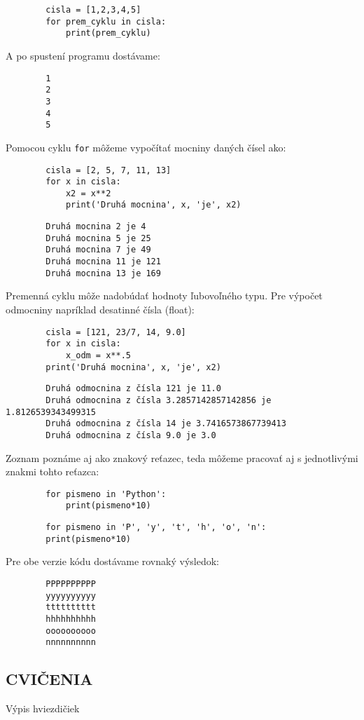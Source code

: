 \documentclass[a4paper,11pt]{report}
\begin{document}
	\begin{verbatim}
		cisla = [1,2,3,4,5]
		for prem_cyklu in cisla:
		    print(prem_cyklu)
	\end{verbatim}
	
	\noindent A po spustení programu dostávame:
	
	\begin{verbatim}
		1
		2
		3
		4
		5
	\end{verbatim}
	
	\noindent Pomocou cyklu \texttt{for} môžeme vypočítať mocniny daných čísel ako:
	
	\begin{verbatim}
		cisla = [2, 5, 7, 11, 13]
		for x in cisla:
		    x2 = x**2
		    print('Druhá mocnina', x, 'je', x2)
	\end{verbatim}
	
	\begin{verbatim}
		Druhá mocnina 2 je 4
		Druhá mocnina 5 je 25
		Druhá mocnina 7 je 49
		Druhá mocnina 11 je 121
		Druhá mocnina 13 je 169
	\end{verbatim}
	
	\noindent Premenná cyklu môže nadobúdať hodnoty ľubovoľného typu. Pre výpočet odmocniny napríklad desatinné čísla (float):
	
	\begin{verbatim}
		cisla = [121, 23/7, 14, 9.0]
		for x in cisla:
		    x_odm = x**.5
		print('Druhá mocnina', x, 'je', x2)
	\end{verbatim}
	
	\begin{verbatim}
		Druhá odmocnina z čísla 121 je 11.0
		Druhá odmocnina z čísla 3.2857142857142856 je 1.8126539343499315
		Druhá odmocnina z čísla 14 je 3.7416573867739413
		Druhá odmocnina z čísla 9.0 je 3.0
	\end{verbatim}
	
	\noindent Zoznam poznáme aj ako znakový reťazec, teda môžeme pracovať aj s jednotlivými znakmi tohto reťazca:
	
	\begin{verbatim}
		for pismeno in 'Python':
		    print(pismeno*10)

	\end{verbatim}
	
	\begin{verbatim}
		for pismeno in 'P', 'y', 't', 'h', 'o', 'n':
		print(pismeno*10)
	\end{verbatim}
	
	\noindent Pre obe verzie kódu dostávame rovnaký výsledok:
	
	\begin{verbatim}
		PPPPPPPPPP
		yyyyyyyyyy
		tttttttttt
		hhhhhhhhhh
		oooooooooo
		nnnnnnnnnn
	\end{verbatim}
	
	\subsection*{CVIČENIA}
	
	Výpis hviezdičiek
\end{document}
